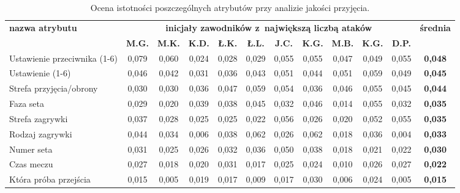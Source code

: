 \documentclass[a4paper,twoside,12pt]{book}
\begin{document}
\begin{table}
\centering
\caption{Ocena istotności poszczególnych atrybutów przy analizie jakości przyjęcia.}
\label{tab:atrybutyPrzyjęcie}
\begin{adjustbox}{angle=90}
\begin{tabular}{|l|c|c|c|c|c|c|c|c|c|c|c|}
\hline
\multirow{2}{*}{\textbf{nazwa atrybutu}} &
\multicolumn{10}{c|}{\textbf{inicjały zawodników z~największą liczbą ataków}} & 
\multirow{2}{*}{\textbf{średnia}}\\
\cline{2-11} & \textbf{M.G.} & \textbf{M.K.} & \textbf{K.D.} & \textbf{Ł.K.} & \textbf{Ł.L.} & \textbf{J.C.} & \textbf{K.G.} & \textbf{M.B.} & \textbf{K.G.} & \textbf{D.P.} & \\
\hline
 Ustawienie przeciwnika (1-6) & \cellcolor{green}0,079 & \cellcolor{green}0,060 & 0,024 & 0,028 & 0,029 & 0,055 & 0,055 & 0,047 & 0,049 & \cellcolor{green}0,055 & \textbf{0,048} \\ \hline
 Ustawienie (1-6) & 0,046 & 0,042 & 0,031 & 0,036 & 0,043 & 0,051 & 0,044 & \cellcolor{green}0,051 & \cellcolor{green}0,059 & 0,049 & \textbf{0,045} \\ \hline
 Strefa przyjęcia/obrony & 0,030 & 0,030 & 0,036 & \cellcolor{green}0,047 & 0,059 & 0,054 & 0,036 & 0,046 & 0,055 & 0,045 & \textbf{0,044} \\ \hline
 Faza seta & 0,029 & 0,020 & \cellcolor{green}0,039 & 0,038 & 0,045 & 0,032 & 0,046 & 0,014 & 0,055 & 0,032 & \textbf{0,035} \\ \hline
 Strefa zagrywki & 0,037 & 0,028 & 0,025 & 0,025 & 0,022 & \cellcolor{green}0,056 & 0,026 & 0,020 & 0,052 & \cellcolor{green}0,055 & \textbf{0,035} \\ \hline
 Rodzaj zagrywki & 0,044 & 0,034 & 0,006 & 0,038 & \cellcolor{green}0,062 & 0,026 & \cellcolor{green}0,062 & 0,018 & 0,036 & 0,004 & \textbf{0,033} \\ \hline
 Numer seta & 0,031 & 0,025 & 0,026 & 0,032 & 0,036 & 0,050 & 0,038 & 0,018 & 0,021 & 0,022 & \textbf{0,030} \\ \hline
 Czas meczu & 0,027 & 0,018 & 0,020 & 0,031 & 0,017 & 0,025 & 0,024 & 0,010 & 0,026 & 0,027 & \textbf{0,022} \\ \hline
 Która próba przejścia & 0,015 & 0,005 & 0,019 & 0,017 & 0,009 & 0,017 & 0,030 & 0,006 & 0,024 & 0,005 & \textbf{0,015} \\ \hline
\end{tabular}
\end{adjustbox}
\end{table}
\end{document}
